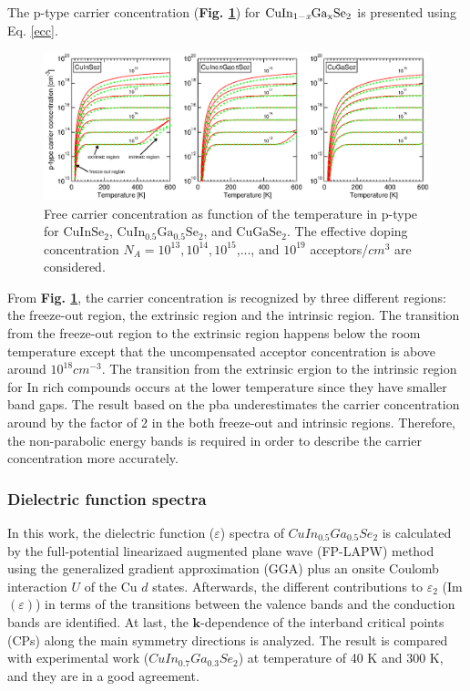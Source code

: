 \documentclass[a4paper, 12pt, titlepage,oneside,drop]{kthesis}
\begin{document}
The p-type carrier concentration (\textbf{Fig. \ref{ptypecc}}) for $\mathrm { CuIn_{1-\textit{x}}Ga_{x}Se_2}$ is presented using Eq. \ref{ecc}. 

 \begin{figure}[H]
    \begin{center}
            \includegraphics[width=1\textwidth,clip]{paper2figure9}
     \end{center}
    \caption{Free carrier concentration as function of the temperature in p-type for $\mathrm{CuInSe_2}$, $\mathrm{CuIn_{0.5}Ga_{0.5}Se_2}$, and $\mathrm{CuGaSe_2}$.
    The effective doping concentration $N_A = 10^{13}, 10^{14}, 10^{15}$,..., and  $10^{19}$ acceptors/$cm^3$ are considered.}
   \label{ptypecc}
\end{figure}

From \textbf{Fig. \ref{ptypecc}}, the carrier concentration is recognized by three different regions: the freeze-out region, the extrinsic region and the intrinsic region. The 
transition from the freeze-out region to the extrinsic region happens below the room temperature except that the uncompensated acceptor concentration is above around 
$10^{18} cm^{-3}$. The transition from the extrinsic ergion to the intrinsic region for In rich compounds occurs at the lower temperature since they have smaller band gaps.
The result based on the pba underestimates the carrier concentration around by the factor of 2 in the both freeze-out and intrinsic regions. Therefore, the 
non-parabolic energy bands is required in order to describe the carrier concentration more accurately.

\subsubsection{Dielectric function spectra}
In this work, the dielectric function ($\varepsilon$) spectra of $CuIn_{0.5}Ga_{0.5}Se_2$ is calculated by the full-potential linearizaed augmented plane wave (FP-LAPW) method using the generalized gradient approximation (GGA)
plus an onsite Coulomb interaction $U$ of the Cu $d$ states. Afterwards, the different contributions to $\varepsilon_2$ (Im$(\varepsilon)$) in terms of the transitions between the valence bands and the conduction bands are identified. At last, 
the $\textbf{k}$-dependence of the interband critical points (CPs) along the main symmetry directions is analyzed. The result is compared with experimental work ($CuIn_{0.7}Ga_{0.3}Se_2$) at temperature of 40 K and 300 K,
and they are in a good agreement.
\end{document}
